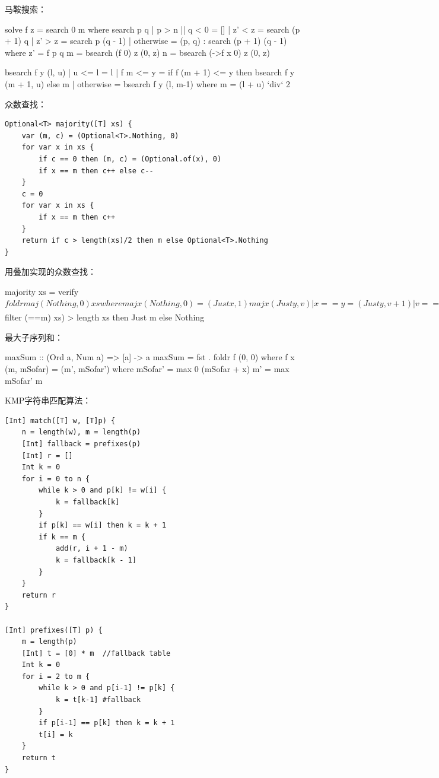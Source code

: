 \documentclass[b5paper]{ctexart}
\begin{document}
马鞍搜索：

\begin{Haskell}
solve f z = search 0 m where
  search p q | p > n || q < 0 = []
             | z' < z = search (p + 1) q
             | z' > z = search p (q - 1)
             | otherwise = (p, q) : search (p + 1) (q - 1)
    where z' = f p q
  m = bsearch (f 0) z (0, z)
  n = bsearch (\x->f x 0) z (0, z)

bsearch f y (l, u) | u <= l = l
                   | f m <= y = if f (m + 1) <= y then bsearch f y (m + 1, u) else m
                   | otherwise = bsearch f y (l, m-1)
  where m = (l + u) `div` 2
\end{Haskell}

众数查找：

\begin{lstlisting}[language = Bourbaki]
Optional<T> majority([T] xs) {
    var (m, c) = (Optional<T>.Nothing, 0)
    for var x in xs {
        if c == 0 then (m, c) = (Optional.of(x), 0)
        if x == m then c++ else c--
    }
    c = 0
    for var x in xs {
        if x == m then c++
    }
    return if c > length(xs)/2 then m else Optional<T>.Nothing
}
\end{lstlisting}

用叠加实现的众数查找：

\begin{Haskell}
majority xs = verify $ foldr maj (Nothing, 0) xs where
  maj x (Nothing, 0) = (Just x, 1)
  maj x (Just y, v) | x == y = (Just y, v + 1)
                    | v == 0 = (Just x, 1)
                    | otherwise = (Just y, v - 1)
  verify (Nothing, _) = Nothing
  verify (Just m, _)  = if 2 * (length $ filter (==m) xs) > length xs
                        then Just m else Nothing
\end{Haskell} %

最大子序列和：

\begin{Haskell}
maxSum :: (Ord a, Num a) => [a] -> a
maxSum = fst . foldr f (0, 0) where
  f x (m, mSofar) = (m', mSofar') where
    mSofar' = max 0 (mSofar + x)
    m' = max mSofar' m
\end{Haskell}

KMP字符串匹配算法：

\begin{lstlisting}[language = Bourbaki]
[Int] match([T] w, [T]p) {
    n = length(w), m = length(p)
    [Int] fallback = prefixes(p)
    [Int] r = []
    Int k = 0
    for i = 0 to n {
        while k > 0 and p[k] != w[i] {
            k = fallback[k]
        }
        if p[k] == w[i] then k = k + 1
        if k == m {
            add(r, i + 1 - m)
            k = fallback[k - 1]
        }
    }
    return r
}

[Int] prefixes([T] p) {
    m = length(p)
    [Int] t = [0] * m  //fallback table
    Int k = 0
    for i = 2 to m {
        while k > 0 and p[i-1] != p[k] {
            k = t[k-1] #fallback
        }
        if p[i-1] == p[k] then k = k + 1
        t[i] = k
    }
    return t
}
\end{lstlisting}
\end{document}
